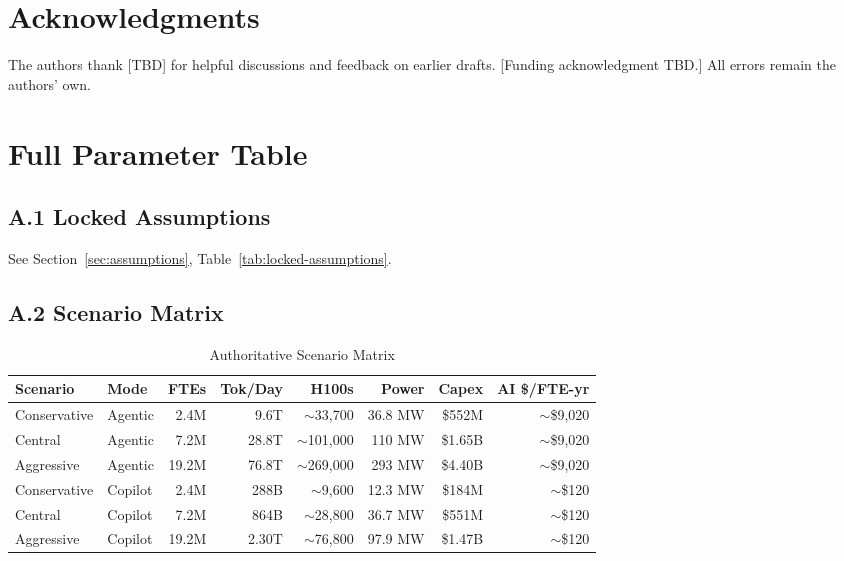 \documentclass{article}
\begin{document}
\section*{Acknowledgments}

The authors thank [TBD] for helpful discussions and feedback on earlier drafts. [Funding
acknowledgment TBD.] All errors remain the authors' own.




\appendix

\section{Full Parameter Table}
\label{app:parameters}

\subsection*{A.1 Locked Assumptions}

See Section~\ref{sec:assumptions}, Table~\ref{tab:locked-assumptions}.

\subsection*{A.2 Scenario Matrix}

\begin{table}[ht]
\centering
\caption{Authoritative Scenario Matrix}
\label{tab:scenario-matrix}
\small
\begin{tabular}{@{}llrrrrrr@{}}
\toprule
\textbf{Scenario} & \textbf{Mode} & \textbf{FTEs} & \textbf{Tok/Day} & \textbf{H100s} & \textbf{Power} & \textbf{Capex} & \textbf{AI \$/FTE-yr} \\
\midrule
Conservative & Agentic & 2.4M & 9.6T & $\sim$33,700 & 36.8 MW & \$552M & $\sim$\$9,020 \\
Central & Agentic & 7.2M & 28.8T & $\sim$101,000 & 110 MW & \$1.65B & $\sim$\$9,020 \\
Aggressive & Agentic & 19.2M & 76.8T & $\sim$269,000 & 293 MW & \$4.40B & $\sim$\$9,020 \\
Conservative & Copilot & 2.4M & 288B & $\sim$9,600 & 12.3 MW & \$184M & $\sim$\$120 \\
Central & Copilot & 7.2M & 864B & $\sim$28,800 & 36.7 MW & \$551M & $\sim$\$120 \\
Aggressive & Copilot & 19.2M & 2.30T & $\sim$76,800 & 97.9 MW & \$1.47B & $\sim$\$120 \\
\bottomrule
\end{tabular}
\end{table}
\end{document}
